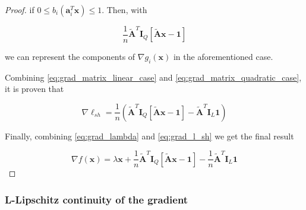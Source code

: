 \documentclass[12pt]{article}
\newcommand{\xb}{\mathbf{x}}
\newcommand{\ab}{\mathbf{a}}
\newcommand{\abi}{\ab_i}
\newcommand{\ellsh}{\ell_{sh}}
\newcommand{\ax}{\abi^T\xb}
\newcommand{\atilde}{\mathbf{\tilde{A}}}
\newcommand{\id}{\mathbf{I}}
\newcommand{\ones}{\mathbf{1}}
\newcommand{\fracn}{\frac{1}{n}}
\newcommand{\quadrpred}{0 \leq b_i(\ax) \leq 1}
\begin{document}
\begin{proof}
if $\quadrpred$. Then, with 

\begin{equation} \label{eq:grad_matrix_quadratic_case}
    \fracn\atilde^T\id_Q[\atilde \xb - \ones]
\end{equation}

we can represent the components of $\nabla g_i(\xb)$ in the aforementioned case.

Combining \eqref{eq:grad_matrix_linear_case} and \eqref{eq:grad_matrix_quadratic_case}, it is proven that

\begin{equation} \label{eq:grad_l_sh}
    \nabla \ellsh = \fracn(\atilde^T\id_Q[\atilde \xb - \ones] - \atilde^T\id_L\ones)
\end{equation}

Finally, combining \eqref{eq:grad_lambda} and \eqref{eq:grad_l_sh} we get the final result

\begin{equation}
    \nabla f(\xb) = \lambda\xb + \fracn\atilde^T\id_Q[\atilde \xb - \ones] - \fracn\atilde^T\id_L\ones
\end{equation}

\end{proof}

\subsubsection*{L-Lipschitz continuity of the gradient}
\end{document}

